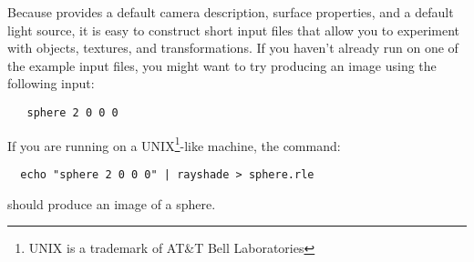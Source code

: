 Because {\rayshade} provides a default camera description, surface properties,
and a default light
source, it is easy to construct short input files that allow you to
experiment with objects, textures, and transformations.
If you haven't already run {\rayshade} on one of the example input files,
you might want to try producing an image using the following input:

\begin{verbatim}
   sphere 2 0 0 0
\end{verbatim}

If you are running {\rayshade} on a UNIX\footnote{UNIX is a trademark
of AT\&T Bell Laboratories}-like machine, the command:
\begin{verbatim}
  echo "sphere 2 0 0 0" | rayshade > sphere.rle
\end{verbatim}
should produce an image of a sphere.
